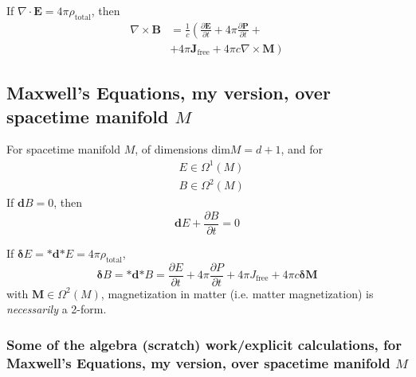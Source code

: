 \documentclass[10pt]{amsart}
\begin{document}
\begin{multicols*}{2}
If $\nabla \cdot \mathbf{E} = 4\pi \rho_{\text{total}}$, then 
\begin{equation}
\begin{aligned}
	\nabla \times \mathbf{B} & = \frac{1}{c} \left( \frac{ \partial \mathbf{E}}{ \partial t} + 4\pi \frac{ \partial \mathbf{P} }{ \partial t} +  \right.  \\
	& \left.   + 4\pi \mathbf{J}_{\text{free}} + 4\pi c \nabla \times \mathbf{M}  \right)
\end{aligned}
\end{equation}

\subsection{Maxwell's Equations, my version, over spacetime manifold $M$}

For spacetime manifold $M$, of dimensions $\text{dim}M = d+1$, and for 
\[
\begin{aligned}
	& E \in \Omega^1(M) \\ 
	& B \in \Omega^2(M)
\end{aligned}
\]
If $\mathbf{d}B=0$, then 
\begin{equation}\label{Eq:MaxwellsEqnsDGEBInduction}
\boxed{ 	\mathbf{d}E + \frac{ \partial B}{ \partial t} = 0  }
\end{equation}

If $\mathbf{\delta}E = \mathbf{*} \mathbf{d} \mathbf{*} E = 4\pi \rho_{\text{total}}$, 
\begin{equation}\label{Eq:MaxwellsEqnsDGEBFaraday}
	\boxed{ \mathbf{\delta} B = \mathbf{*} \mathbf{d} \mathbf{*} B = \frac{ \partial E}{ \partial t} + 4\pi \frac{ \partial P}{ \partial t} + 4\pi J_{\text{free}} + 4\pi c \mathbf{\delta} \mathbf{M} }
\end{equation}
with $\mathbf{M} \in \Omega^2(M)$, magnetization in matter (i.e. matter magnetization) is \emph{necessarily} a 2-form.  

\subsubsection{Some of the algebra (scratch) work/explicit calculations, for Maxwell's Equations, my version, over spacetime manifold $M$}


\end{multicols*}
\end{document}
